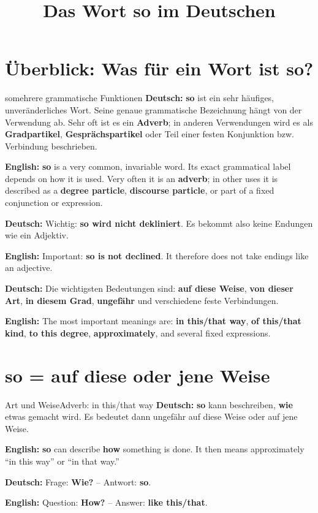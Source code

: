 \documentclass[a4paper,11pt]{article}
\title{Das Wort \glqq so\grqq{} im Deutschen}
\date{}
\newcommand{\GermanText}[1]{\textbf{Deutsch: }#1\par}
\newcommand{\EnglishText}[1]{{\small\color{SoftGray}\textbf{English: }#1\par}}
\begin{document}
    \maketitle
    \tableofcontents
    \newpage

    \section{Überblick: Was für ein Wort ist \glqq so\grqq?}

        \begin{grammarentry}{so}{mehrere grammatische Funktionen}
            \GermanText{\textbf{so} ist ein sehr häufiges, unveränderliches Wort. Seine genaue grammatische Bezeichnung hängt von der Verwendung ab. Sehr oft ist es ein \textbf{Adverb}; in anderen Verwendungen wird es als \textbf{Gradpartikel}, \textbf{Gesprächspartikel} oder Teil einer festen Konjunktion bzw. Verbindung beschrieben.}
            \EnglishText{\textbf{so} is a very common, invariable word. Its exact grammatical label depends on how it is used. Very often it is an \textbf{adverb}; in other uses it is described as a \textbf{degree particle}, \textbf{discourse particle}, or part of a fixed conjunction or expression.}

            \GermanText{Wichtig: \textbf{so wird nicht dekliniert}. Es bekommt also keine Endungen wie ein Adjektiv.}
            \EnglishText{Important: \textbf{so is not declined}. It therefore does not take endings like an adjective.}

            \GermanText{Die wichtigsten Bedeutungen sind: \textbf{auf diese Weise}, \textbf{von dieser Art}, \textbf{in diesem Grad}, \textbf{ungefähr} und verschiedene feste Verbindungen.}
            \EnglishText{The most important meanings are: \textbf{in this/that way}, \textbf{of this/that kind}, \textbf{to this degree}, \textbf{approximately}, and several fixed expressions.}
        \end{grammarentry}

    \section{\glqq so\grqq{} = auf diese oder jene Weise}

        \begin{grammarentry}{Art und Weise}{Adverb: in this/that way}
            \GermanText{\textbf{so} kann beschreiben, \textbf{wie} etwas gemacht wird. Es bedeutet dann ungefähr \glqq auf diese Weise\grqq{} oder \glqq auf jene Weise\grqq.}
            \EnglishText{\textbf{so} can describe \textbf{how} something is done. It then means approximately ``in this way'' or ``in that way.''}

            \GermanText{Frage: \textbf{Wie?} -- Antwort: \textbf{so}.}
            \EnglishText{Question: \textbf{How?} -- Answer: \textbf{like this/that}.}
        \end{grammarentry}
\end{document}
